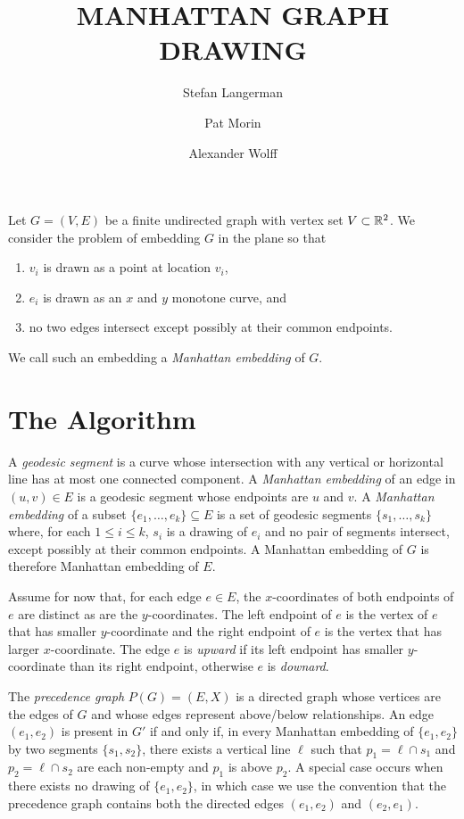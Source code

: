 \documentclass[lotsofwhite]{patmorin}
\title{\MakeUppercase{Manhattan Graph Drawing}}
\author{Stefan Langerman \and Pat Morin \and Alexander Wolff}
\date{}
\begin{document}
\maketitle

Let $G=(V,E)$ be a finite undirected graph with vertex set
$V\subset\mathbb{R}^2$.  We consider the problem of embedding $G$ in the plane
so that
\begin{enumerate}
\item $v_i$ is drawn as a point at location $v_i$,
\item $e_i$ is drawn as an $x$ and $y$ monotone curve, and
\item no two edges intersect except possibly at their common endpoints.
\end{enumerate}
We call such an embedding a \emph{Manhattan embedding} of $G$.

\section{The Algorithm}

A \emph{geodesic segment} is a curve whose intersection with any
vertical or horizontal line has at most one connected component.  A
\emph{Manhattan embedding} of an edge in $(u,v)\in E$ is a geodesic
segment whose endpoints are $u$ and $v$.  A \emph{Manhattan embedding}
of a subset $\{e_1,\ldots,e_k\}\subseteq E$ is a set of geodesic
segments $\{s_1,\ldots,s_k\}$ where, for each $1\le i\le k$, $s_i$ is
a drawing of $e_i$ and no pair of segments intersect, except possibly
at their common endpoints.  A Manhattan embedding of $G$ is therefore
Manhattan embedding of $E$.

Assume for now that, for each edge $e\in E$, the $x$-coordinates of
both endpoints of $e$ are distinct as are the $y$-coordinates.  The
left endpoint of $e$ is the vertex of $e$ that has smaller
$y$-coordinate and the right endpoint of $e$ is the vertex that has
larger $x$-coordinate.  The edge $e$ is \emph{upward} if its left
endpoint has smaller $y$-coordinate than its right endpoint, otherwise
$e$ is \emph{downard}.

The \emph{precedence graph} $P(G)=(E,X)$ is a directed graph whose
vertices are the edges of $G$ and whose edges represent above/below
relationships.  An edge $(e_1,e_2)$ is present in $G'$ if and only if,
in every Manhattan embedding of $\{e_1,e_2\}$ by two segments
$\{s_1,s_2\}$, there exists a vertical line $\ell$ such that
$p_1=\ell\cap s_1$ and $p_2=\ell\cap s_2$ are each non-empty and $p_1$
is above $p_2$.  A special case occurs when there exists no drawing of
$\{e_1,e_2\}$, in which case we use the convention that the precedence
graph contains both the directed edges $(e_1,e_2)$ and $(e_2,e_1)$.
\end{document}
